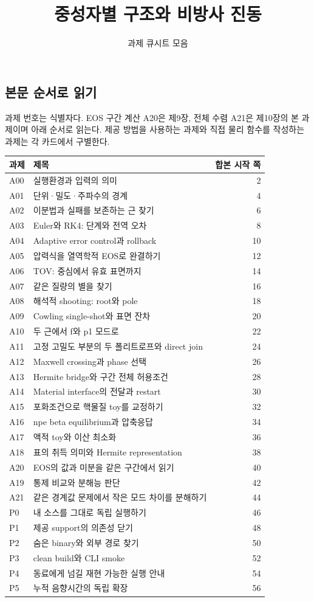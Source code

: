 \documentclass[
  10pt,
  a4paper,
]{article}
\title{중성자별 구조와 비방사 진동}
\subtitle{과제 큐시트 모음}
\author{}
\date{}
\begin{document}
\maketitle

\subsection{본문 순서로
읽기}\label{uxbcf8uxbb38-uxc21cuxc11cuxb85c-uxc77duxae30}

과제 번호는 식별자다. EOS 구간 계산 A20은 제9장, 전체 수렴 A21은
제10장의 본 과제이며 아래 순서로 읽는다. 제공 방법을 사용하는 과제와
직접 물리 함수를 작성하는 과제는 각 카드에서 구별한다.

\begin{longtable}[]{@{}llr@{}}
\toprule\noalign{}
과제 & 제목 & 합본 시작 쪽 \\
\midrule\noalign{}
\endhead
\bottomrule\noalign{}
\endlastfoot
A00 & 실행환경과 입력의 의미 & 2 \\
A01 & 단위·밀도·주파수의 경계 & 4 \\
A02 & 이분법과 실패를 보존하는 근 찾기 & 6 \\
A03 & Euler와 RK4: 단계와 전역 오차 & 8 \\
A04 & Adaptive error control과 rollback & 10 \\
A05 & 압력식을 열역학적 EOS로 완결하기 & 12 \\
A06 & TOV: 중심에서 유효 표면까지 & 14 \\
A07 & 같은 질량의 별을 찾기 & 16 \\
A08 & 해석적 shooting: root와 pole & 18 \\
A09 & Cowling single-shot와 표면 잔차 & 20 \\
A10 & 두 근에서 f와 p1 모드로 & 22 \\
A11 & 고정 고밀도 부분의 두 폴리트로프와 direct join & 24 \\
A12 & Maxwell crossing과 phase 선택 & 26 \\
A13 & Hermite bridge와 구간 전체 허용조건 & 28 \\
A14 & Material interface의 전달과 restart & 30 \\
A15 & 포화조건으로 핵물질 toy를 교정하기 & 32 \\
A16 & npe beta equilibrium과 압축응답 & 34 \\
A17 & 액적 toy와 이산 최소화 & 36 \\
A18 & 표의 취득 의미와 Hermite representation & 38 \\
A20 & EOS의 값과 미분을 같은 구간에서 읽기 & 40 \\
A19 & 통제 비교와 분해능 판단 & 42 \\
A21 & 같은 경계값 문제에서 작은 모드 차이를 분해하기 & 44 \\
P0 & 내 소스를 그대로 독립 실행하기 & 46 \\
P1 & 제공 support의 의존성 닫기 & 48 \\
P2 & 숨은 binary와 외부 경로 찾기 & 50 \\
P3 & clean build와 CLI smoke & 52 \\
P4 & 동료에게 넘길 재현 가능한 실행 안내 & 54 \\
P5 & 누적 음향시간의 독립 확장 & 56 \\
\end{longtable}
\end{document}
